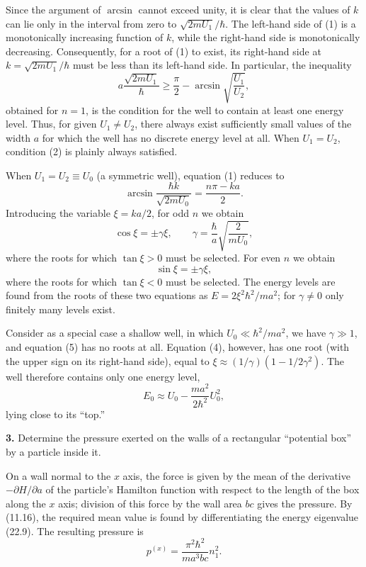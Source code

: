 Since the argument of $\arcsin$ cannot exceed unity, it is clear that the
values of $k$ can lie only in the interval from zero to
$\sqrt{2mU_1}/\hbar$. The left-hand side of (1) is a monotonically increasing
function of $k$, while the right-hand side is monotonically decreasing.
Consequently, for a root of (1) to exist, its right-hand side at
$k=\sqrt{2mU_1}/\hbar$ must be less than its left-hand side. In particular,
the inequality
\begin{equation}
  a\frac{\sqrt{2mU_1}}{\hbar}
  \geq\frac{\pi}{2}-\arcsin\sqrt{\frac{U_1}{U_2}},
  \tag{2}
\end{equation}
obtained for $n=1$, is the condition for the well to contain at least one
energy level. Thus, for given $U_1\ne U_2$, there always exist sufficiently
small values of the width $a$ for which the well has no discrete energy level
at all. When $U_1=U_2$, condition (2) is plainly always satisfied.

When $U_1=U_2\equiv U_0$ (a symmetric well), equation (1) reduces to
\begin{equation}
  \arcsin\frac{\hbar k}{\sqrt{2mU_0}}=\frac{n\pi-ka}{2}.
  \tag{3}
\end{equation}
Introducing the variable $\xi=ka/2$, for odd $n$ we obtain
\begin{equation}
  \cos\xi=\pm\gamma\xi,
  \qquad \gamma=\frac{\hbar}{a}\sqrt{\frac{2}{mU_0}},
  \tag{4}
\end{equation}
where the roots for which $\tan\xi>0$ must be selected. For even
$n$ we obtain
\begin{equation}
  \sin\xi=\pm\gamma\xi,
  \tag{5}
\end{equation}
where the roots for which $\tan\xi<0$ must be selected. The
energy levels are found from the roots of these two equations as
$E=2\xi^2\hbar^2/ma^2$; for $\gamma\ne0$ only finitely many levels exist.

Consider as a special case a shallow well, in which
$U_0\ll\hbar^2/ma^2$, we have $\gamma\gg1$, and equation (5) has no roots at all.
Equation (4), however, has one root (with the upper sign on its right-hand
side), equal to $\xi\approx(1/\gamma)(1-1/2\gamma^2)$. The well therefore
contains only one energy level,
\[
  E_0\approx U_0-\frac{ma^2}{2\hbar^2}U_0^2,
\]
lying close to its ``top.''

\ProblemHeading
\noindent\textbf{3.} Determine the pressure exerted on the walls of a
rectangular ``potential box'' by a particle inside it.

\SolutionHeading
On a wall normal to the $x$ axis, the force is given by the mean of
the derivative $-\partial H/\partial a$ of the particle's Hamilton function
with respect to the length of the box along the $x$ axis; division of this
force by the wall area $bc$ gives the pressure. By (11.16), the required mean
value is found by differentiating the energy eigenvalue (22.9). The resulting
pressure is
\[
  p^{(x)}=\frac{\pi^2\hbar^2}{ma^3bc}n_1^2.
\]
